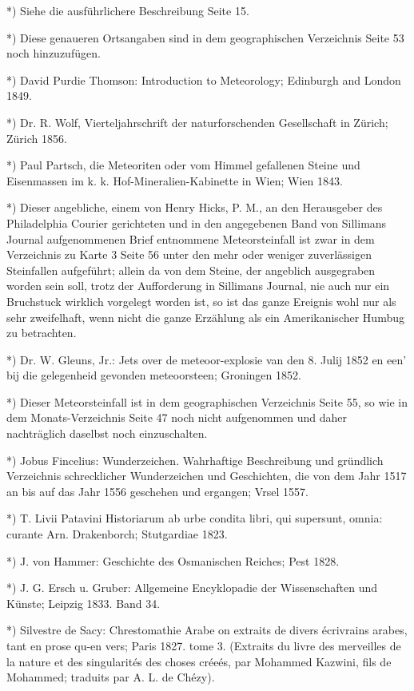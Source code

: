 \documentclass[a4paper, 11pt, oneside, polutonikogreek, german]{article}
\begin{document}
*) Siehe die ausführlichere Beschreibung Seite 15.

*) Diese genaueren Ortsangaben sind in dem geographischen Verzeichnis Seite 53 noch hinzuzufügen.

*) David Purdie Thomson: Introduction to Meteorology; Edinburgh and London 1849.

*) Dr. R. Wolf, Vierteljahrschrift der naturforschenden Gesellschaft in Zürich; Zürich 1856.

*) Paul Partsch, die Meteoriten oder vom Himmel gefallenen Steine und Eisenmassen im k. k. Hof-Mineralien-Kabinette in Wien; Wien 1843.

*) Dieser angebliche, einem von Henry Hicks, P. M., an den Herausgeber des Philadelphia Courier gerichteten und in den angegebenen Band von Sillimans Journal aufgenommenen Brief entnommene Meteorsteinfall ist zwar in dem Verzeichnis zu Karte 3 Seite 56 unter den mehr oder weniger zuverlässigen Steinfallen aufgeführt; allein da von dem Steine, der angeblich ausgegraben worden sein soll, trotz der Aufforderung in Sillimans Journal, nie auch nur ein Bruchstuck wirklich vorgelegt worden ist, so ist das ganze Ereignis wohl nur als sehr zweifelhaft, wenn nicht die ganze Erzählung als ein Amerikanischer Humbug zu betrachten.

*) Dr. W. Gleuns, Jr.: Jets over de meteoor-explosie van den 8. Julij 1852 en een' bij die gelegenheid gevonden meteoorsteen; Groningen 1852.

*) Dieser Meteorsteinfall ist in dem geographischen Verzeichnis Seite 55, so wie in dem Monats-Verzeichnis Seite 47 noch nicht aufgenommen und daher nachträglich daselbst noch einzuschalten.

*) Jobus Fincelius: Wunderzeichen. Wahrhaftige Beschreibung und gründlich Verzeichnis schrecklicher Wunderzeichen und Geschichten, die von dem Jahr 1517 an bis auf das Jahr 1556 geschehen und ergangen; Vrsel 1557.

*) T. Livii Patavini Historiarum ab urbe condita libri, qui supersunt, omnia: curante Arn. Drakenborch; Stutgardiae 1823.

*) J. von Hammer: Geschichte des Osmanischen Reiches; Pest 1828.

*) J. G. Ersch u. Gruber: Allgemeine Encyklopadie der Wissenschaften und Künste; Leipzig 1833. Band 34.

*) Silvestre de Sacy: Chrestomathie Arabe on extraits de divers écrivrains arabes, tant en prose qu-en vers; Paris 1827. tome 3. (Extraits du livre des merveilles de la nature et des singularités des choses créeés, par Mohammed Kazwini, fils de Mohammed; traduits par A. L. de Chézy).
\end{document}
